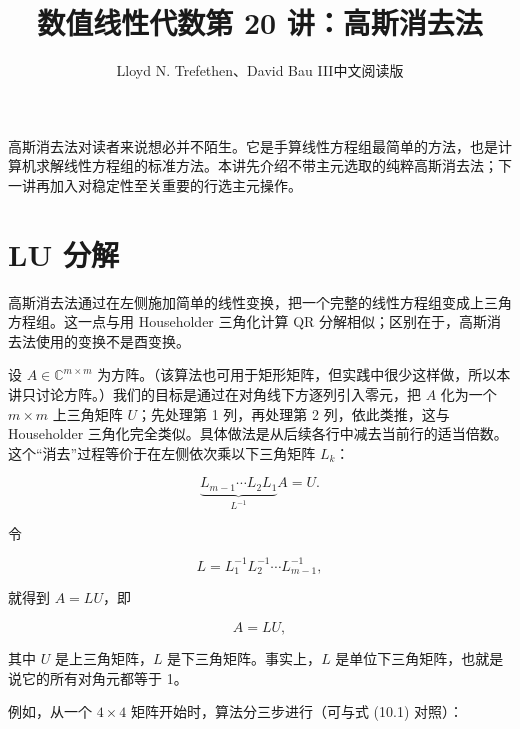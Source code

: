 \documentclass[UTF8,fontset=none,12pt]{ctexart}
\title{数值线性代数\quad 第 20 讲：高斯消去法}
\author{Lloyd N. Trefethen、David Bau III\quad 中文阅读版}
\date{}
\theoremstyle{definition}
\begin{document}
\maketitle
\pagestyle{plain}

高斯消去法对读者来说想必并不陌生。它是手算线性方程组最简单的方法，也是计算机求解线性方程组的标准方法。本讲先介绍不带主元选取的纯粹高斯消去法；下一讲再加入对稳定性至关重要的行选主元操作。

\section*{LU 分解}

高斯消去法通过在左侧施加简单的线性变换，把一个完整的线性方程组变成上三角方程组。这一点与用 Householder 三角化计算 QR 分解相似；区别在于，高斯消去法使用的变换不是酉变换。

设 $A\in\mathbb{C}^{m\times m}$ 为方阵。（该算法也可用于矩形矩阵，但实践中很少这样做，所以本讲只讨论方阵。）我们的目标是通过在对角线下方逐列引入零元，把 $A$ 化为一个 $m\times m$ 上三角矩阵 $U$；先处理第 1 列，再处理第 2 列，依此类推，这与 Householder 三角化完全类似。具体做法是从后续各行中减去当前行的适当倍数。这个“消去”过程等价于在左侧依次乘以下三角矩阵 $L_k$：

\begin{equation}
    \underbrace{L_{m-1}\cdots L_2L_1}_{L^{-1}}A=U.
\tag{20.1}
\end{equation}

令

$$
L=L_1^{-1}L_2^{-1}\cdots L_{m-1}^{-1},
$$

就得到 $A=LU$，即

\begin{equation}
    A=LU,
\tag{20.2}
\end{equation}

其中 $U$ 是上三角矩阵，$L$ 是下三角矩阵。事实上，$L$ 是单位下三角矩阵，也就是说它的所有对角元都等于 1。

例如，从一个 $4\times4$ 矩阵开始时，算法分三步进行（可与式 (10.1) 对照）：
\end{document}
